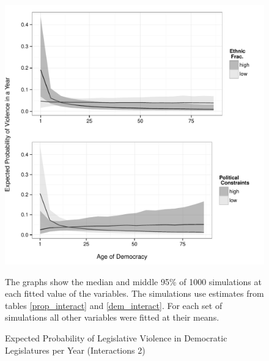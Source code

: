 \documentclass[a4paper]{article}\usepackage[]{graphicx}\usepackage[]{color}
\newenvironment{knitrout}{}{} %
\begin{document}
\begin{figure}
    \begin{center}
\begin{knitrout}
\color{fgcolor}
\includegraphics[width=0.95\linewidth]{figure/predProInteract2-1} 

\end{knitrout}

    \end{center}
    \caption{Expected Probability of Legislative Violence in Democratic Legislatures per Year (Interactions 2)}
    \label{interact_plots2}
    \begin{singlespace}
      {\scriptsize{The graphs show the median and middle 95\% of 1000 simulations at each fitted value of the variables. The simulations use estimates from tables \ref{prop_interact} and \ref{dem_interact}. For each set of simulations all other variables were fitted at their means.}}
    \end{singlespace}
\end{figure}


\end{document}
